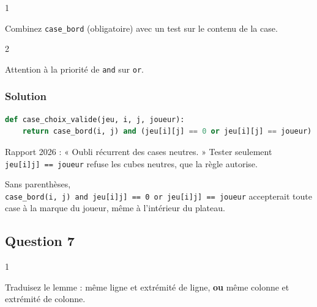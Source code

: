 \documentclass[11pt,a4paper]{article}
\begin{document}
\begin{indication}{1}

Combinez \texttt{case\_bord} (obligatoire) avec un test sur le contenu de la case.

\end{indication}

\begin{indication}{2}

Attention à la priorité de \texttt{and} sur \texttt{or}.

\end{indication}

\hypertarget{solution-5}{%
\subsubsection{Solution}\label{solution-5}}

\begin{lstlisting}[language=Python]
def case_choix_valide(jeu, i, j, joueur):
    return case_bord(i, j) and (jeu[i][j] == 0 or jeu[i][j] == joueur)
\end{lstlisting}

\begin{piege}

Rapport 2026 : « Oubli récurrent des cases neutres. » Tester seulement \texttt{jeu{[}i{]}\allowbreak{}{[}j{]}\allowbreak{}\ =\allowbreak{}=\allowbreak{}\ joueur} refuse les cubes neutres, que la règle autorise.

\end{piege}

\begin{piege}

Sans parenthèses, \texttt{case\_bord(\allowbreak{}i,\allowbreak{}\ j)\allowbreak{}\ and\ jeu{[}i{]}\allowbreak{}{[}j{]}\allowbreak{}\ =\allowbreak{}=\allowbreak{}\ 0\ or\ jeu{[}i{]}\allowbreak{}{[}j{]}\allowbreak{}\ =\allowbreak{}=\allowbreak{}\ joueur} accepterait toute case à la marque du joueur, même à l'intérieur du plateau.

\end{piege}

\hypertarget{question-7}{%
\subsection{Question 7}\label{question-7}}

\begin{indication}{1}

Traduisez le lemme : même ligne et extrémité de ligne, \textbf{ou} même colonne et extrémité de colonne.

\end{indication}
\end{document}

